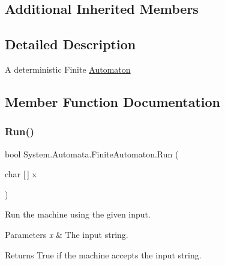 \subsection*{Additional Inherited Members}


\subsection{Detailed Description}
A deterministic Finite \mbox{\hyperlink{class_system_1_1_automata_1_1_automaton}{Automaton}} 



\subsection{Member Function Documentation}
\mbox{\label{class_system_1_1_automata_1_1_finite_automaton_a8c6c352f912d13d5a0047583a34247db}} 
\subsubsection{\texorpdfstring{Run()}{Run()}\hspace{0.1cm}{\footnotesize\ttfamily [1/2]}}
{\footnotesize\ttfamily bool System.\+Automata.\+Finite\+Automaton.\+Run (\begin{DoxyParamCaption}\item[{char \mbox{[}$\,$\mbox{]}}]{x }\end{DoxyParamCaption})}



Run the machine using the given input. 


\begin{DoxyParams}{Parameters}
{\em x} & The input string.\\
\hline
\end{DoxyParams}
\begin{DoxyReturn}{Returns}
True if the machine accepts the input string.
\end{DoxyReturn}
\mbox{\label{class_system_1_1_automata_1_1_finite_automaton_aaa76a2104f685809c00c7adc8ceb240f}} 
